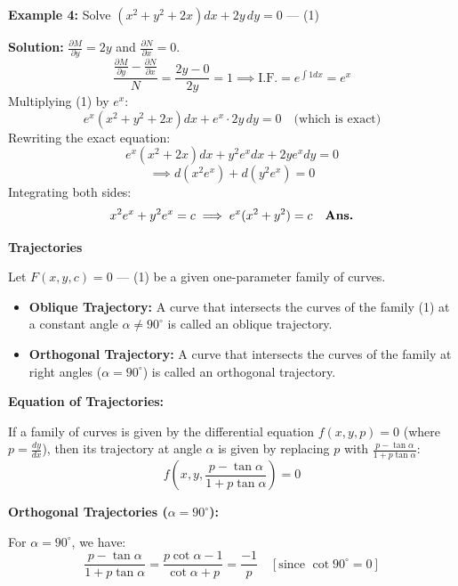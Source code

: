 \documentclass[11pt,a4paper]{article}
\newcommand{\Heading}[1]{\vspace{0.3cm}\noindent\textbf{\textcolor{AcademicGreen}{\large #1}}\par\vspace{0.15cm}}
\begin{document}
\vspace{0.3cm}
\begin{tcolorbox}[greenbox]
    \textbf{\textcolor{AcademicGreen}{Example 4:}} Solve $(x^2 + y^2 + 2x)dx + 2y \, dy = 0$ \quad --- (1)
    
    \vspace{0.15cm}
    \noindent\textbf{Solution:} $\frac{\partial M}{\partial y} = 2y$ and $\frac{\partial N}{\partial x} = 0$.
    \[
    \frac{\frac{\partial M}{\partial y} - \frac{\partial N}{\partial x}}{N} = \frac{2y - 0}{2y} = 1 \implies \text{I.F.} = e^{\int 1 dx} = e^x
    \]
    Multiplying (1) by $e^x$:
    \[
    e^x(x^2 + y^2 + 2x)dx + e^x \cdot 2y \, dy = 0 \quad \text{(which is exact)}
    \]
    Rewriting the exact equation:
    \[
    e^x(x^2 + 2x)dx + y^2 e^x dx + 2y e^x dy = 0
    \]
    \[
    \implies d(x^2 e^x) + d(y^2 e^x) = 0
    \]
    Integrating both sides:
    \[
    x^2 e^x + y^2 e^x = c \implies e^x(x^2 + y^2) = c \quad \text{\textbf{Ans.}}
    \]
\end{tcolorbox}

\vspace{0.4cm}
\begin{center}
    {\large\bfseries\textcolor{AcademicGreen}{Trajectories}} \\[0.2cm]
    \vspace{0.3cm}
\end{center}
Let $F(x,y,c) = 0$ \quad --- (1) be a given one-parameter family of curves.

\begin{itemize}[leftmargin=*]
    \item \textbf{Oblique Trajectory:} A curve that intersects the curves of the family (1) at a constant angle $\alpha \neq 90^\circ$ is called an oblique trajectory.
    \item \textbf{Orthogonal Trajectory:} A curve that intersects the curves of the family at right angles ($\alpha = 90^\circ$) is called an orthogonal trajectory.
\end{itemize}

\vspace{0.2cm}
\Heading{Equation of Trajectories:}
If a family of curves is given by the differential equation $f(x,y,p) = 0$ (where $p = \frac{dy}{dx}$), then its trajectory at angle $\alpha$ is given by replacing $p$ with $\frac{p - \tan \alpha}{1 + p \tan \alpha}$:
\[
f\left(x, y, \frac{p - \tan \alpha}{1 + p \tan \alpha}\right) = 0
\]

\vspace{0.2cm}
\Heading{Orthogonal Trajectories ($\alpha = 90^\circ$):}
For $\alpha = 90^\circ$, we have:
\[
\frac{p - \tan \alpha}{1 + p \tan \alpha} = \frac{p \cot \alpha - 1}{\cot \alpha + p} = \frac{-1}{p} \quad [\text{since } \cot 90^\circ = 0]
\]
\end{document}
